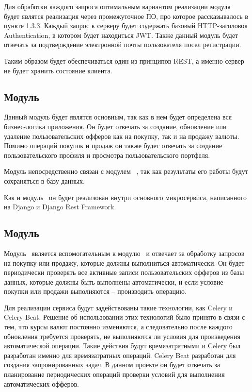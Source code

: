 Для обработки каждого запроса оптимальным вариантом реализации модуля \moduleAuth будет являтся реализация через промежуточное ПО,
про которое рассказывалось в пункте 1.3.3.
Каждый запрос к серверу будет содержать базовый HTTP-заголовок Authentication, в котором будет находиться JWT.
Также данный модуль будет отвечать за подтверждение электронной почты пользователя посел регистрации.

Таким образом будет обеспечиваться один из принципов REST, а именно сервер не будет хранить состояние клиента.

\subsection{Модуль \moduleTrading}\label{subsec:sys:module-trading}
Данный модуль будет являтся основным, так как в нем будет определена вся бизнес-логика приложения.
Он будет отвечать за создание, обновление или удаление пользовательских офферов как на покупку, так и на продажу валюты.
Помимо операций покупок и продаж он также будет отвечать за создание пользовательского профиля и просмотра пользовательского портфеля.

Модуль \moduleTrading непосредственно связан с модулем ~\moduleCommunicationPostgres, так как результаты его работы будут сохраняться в базу данных.

Как и модуль \moduleAuth ~он будет реализован внутри основного микросервиса, написанного на Django и Django Rest Framework.

\subsection{Модуль \moduleAutoTrading}\label{subsec:sys:module-auto-trading}
Модуль \moduleAutoTrading ~является вспомогательным к модулю \moduleAutoTrading ~и отвечает за обработку запросов на покупку или продажу, которые должны выполниться автоматически.
Он будет периодически проверять все активные записи пользовательских офферов из базы данных, которые должны быть выполнены автоматически, и если условие покупки или продажи выполняются -- производить операцию.

Для реализации сервиса будут задействованы такие технологии, как Celery и Celery Beat.
Решение об использовании этих технологий было принято в связи с тем, что курсы валют постоянно изменяются, а следовательно после каждого обновления требуется проверять, не выполняются ли условия для произведения автоматической операции.
Такие действия будут времязатратными и Celery был разработан именно для времязатратных операций.
Celery Beat разработан для создания запронированных задач.
В данном проекте он будет отвечать за планирование периодических операций проверки условий для выполнения автоматических офферов.


